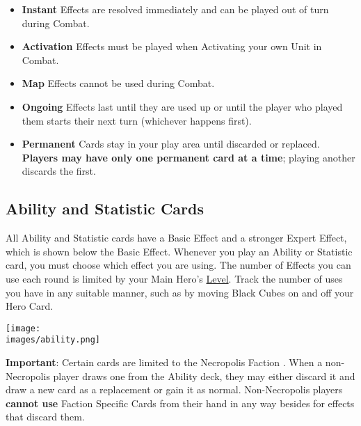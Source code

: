 \begin{multicols*}{2}
\begin{enumerate}
  \begin{itemize}
        \item \textbf{Instant}  Effects are resolved immediately and can be played out of turn during Combat.
        \item \textbf{Activation}  Effects must be played when Activating your own Unit in Combat.
        \item \textbf{Map}  Effects cannot be used during Combat.
        \item \textbf{Ongoing}  Effects last until they are used up or until the player who played them starts their next turn (whichever happens first).
        \item \textbf{Permanent}  Cards stay in your play area until discarded or replaced.
          \textbf{Players may have only one permanent card at a time}; playing another discards the first.
    \end{itemize}
\end{enumerate}

\clearpage

\subsection*{\hypertarget{Ability}{Ability and Statistic Cards}}

All Ability and Statistic cards have a Basic Effect and a stronger Expert  Effect, which is shown below the Basic Effect.
Whenever you play an Ability or Statistic card, you must choose which effect you are using.
The number of  Effects you can use each round is limited by your Main Hero's \hyperlink{Level}{Level}.
Track the number of uses you have in any suitable manner, such as by moving Black Cubes on and off your Hero Card.\par
\bigskip

\texttt{[image: \\images/ability.png]}

\textbf{Important}: Certain cards are limited to the Necropolis Faction .
When a non-Necropolis player draws one from the Ability deck, they may either discard it and draw a new card as a replacement or gain it as normal.
Non-Necropolis players \textbf{cannot use} Faction Specific Cards from their hand in any way besides for effects that discard them.


\end{multicols*}
